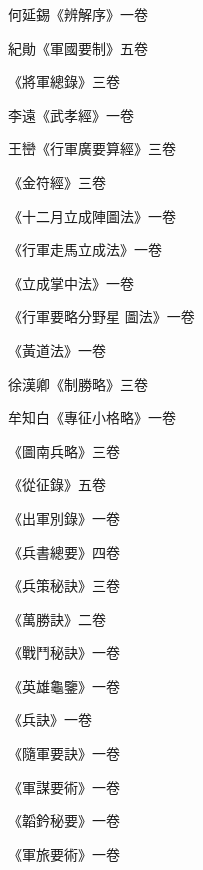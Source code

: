 \begin{pinyinscope}
 何延錫《辨解序》一卷



 紀勛《軍國要制》五卷



 《將軍總錄》三卷



 李遠《武孝經》一卷



 王巒《行軍廣要算經》三卷



 《金符經》三卷



 《十二月立成陣圖法》一卷



 《行軍走馬立成法》一卷



 《立成掌中法》一卷



 《行軍要略分野星
 圖法》一卷



 《黃道法》一卷



 徐漢卿《制勝略》三卷



 牟知白《專征小格略》一卷



 《圖南兵略》三卷



 《從征錄》五卷



 《出軍別錄》一卷



 《兵書總要》四卷



 《兵策秘訣》三卷



 《萬勝訣》二卷



 《戰鬥秘訣》一卷



 《英雄龜鑒》一卷



 《兵訣》一卷



 《隨軍要訣》一卷



 《軍謀要術》一卷



 《韜鈐秘要》一卷



 《軍旅要術》一卷




\end{pinyinscope}
